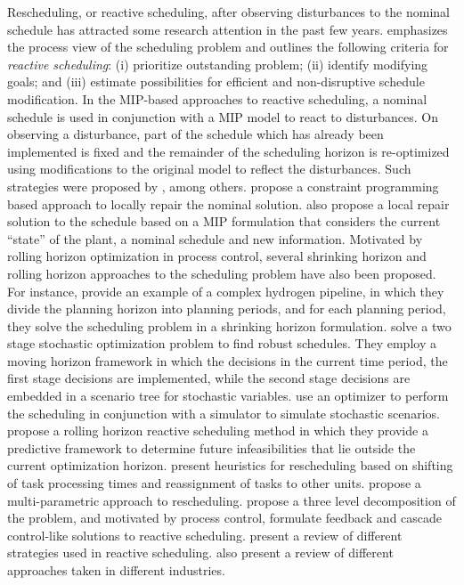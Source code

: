 Rescheduling, or reactive scheduling, after observing disturbances to
the nominal schedule has attracted some research attention in the past
few years. \citet{smith:1995} emphasizes the process view of the
scheduling problem and outlines the following criteria for {\em{reactive
scheduling}}: (i) prioritize outstanding problem; (ii) identify
modifying goals; and (iii) estimate possibilities for efficient and
non-disruptive schedule modification. In the MIP-based approaches to
reactive scheduling, a nominal schedule is used in conjunction with a
MIP model to react to disturbances. On observing a disturbance,  part
of the schedule which has already been implemented is fixed and the
remainder of the scheduling horizon is re-optimized using
modifications to the original model to reflect the disturbances. Such
strategies were proposed by
\citet{vin:jeetmanyu:ierapetritou:2000,janak:floudas:kallrath:vormbrock:2006, 
relvas:matos:barbosa:fialho:2007},  
among others. \citet{novas:henning:2010} propose a constraint
programming based approach to locally repair the nominal
solution. \citet{mendez:cerda:2003} also propose a local repair
solution to the schedule based on a MIP formulation that considers the
current ``state'' of the plant, a nominal schedule and new
information. Motivated by rolling horizon optimization in process
control, several shrinking horizon and rolling horizon approaches to
the scheduling problem have also been proposed. For instance,
\citet{van:grossmann:2003} provide an example of a complex hydrogen
pipeline, in which they divide the planning horizon into planning
periods, and for each planning period, they solve the scheduling
problem in a shrinking horizon formulation. \citet{sand:engell:2004}
solve a two stage stochastic optimization problem to find robust
schedules. They employ a moving horizon framework in which the
decisions in the current time period, the first stage decisions are
implemented, while the second stage decisions are embedded in a
scenario tree for stochastic
variables. \citet{honkomp:mockus:reklaitis:1999} use an optimizer to
perform the scheduling in conjunction with a simulator to simulate
stochastic scenarios. \citet{rodrigues:gimeno:passos:campos:1996}
propose a rolling horizon reactive scheduling method in which they
provide a predictive framework to determine future infeasibilities that
lie outside the current optimization
horizon. \citet{huercio:espuna:puigjaner:1995} present heuristics for
rescheduling based on shifting of task processing times and
reassignment of tasks to other units. \citet{li:ierapetritou:2008a}
propose a multi-parametric approach to rescheduling.
\citet{munawar:gudi:2005} propose a three level decomposition of the
problem, and motivated by process control, formulate feedback and
cascade control-like solutions to reactive
scheduling. \citet{li:ierapetritou:2008b} present a review of
different strategies used in reactive
scheduling. \citet{verderame:elia:li:floudas:2010} also present a
review of different approaches taken in different industries.



